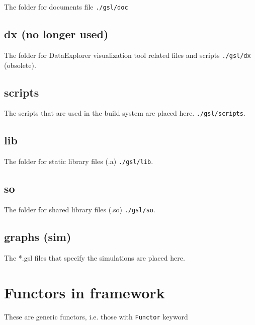 The folder for documents file \verb!./gsl/doc!

\subsection{dx (no longer used)}

The folder for DataExplorer visualization tool related files and scripts
\verb!./gsl/dx! (obsolete).

\subsection{scripts}

The scripts that are used in the build system are placed
here. \verb!./gsl/scripts!.

\subsection{lib}

The folder for static library files (.a) \verb!./gsl/lib!.

\subsection{so}

The folder for shared library files (.so) \verb!./gsl/so!.


\subsection{graphs (sim)}

The *.gsl files that specify the simulations are placed here.

\section{Functors in framework}

These are generic functors, i.e. those with \verb!Functor! keyword

